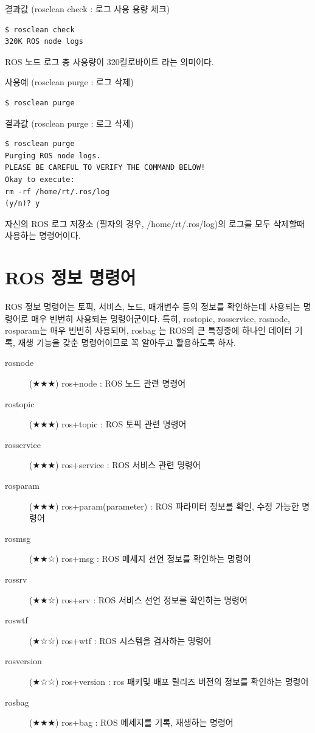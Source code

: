 \noindent
{}\circled{\thenum} 결과값 (rosclean check : 로그 사용 용량 체크)
\begin{lstlisting}[language=ROS]
$ rosclean check
320K ROS node logs
\end{lstlisting}

\noindent
ROS 노드 로그 총 사용량이 320킬로바이트 라는 의미이다.

\vspace{\baselineskip}
\noindent
{}\circled{\thenum} 사용예 (rosclean purge : 로그 삭제)
\begin{lstlisting}[language=ROS]
$ rosclean purge
\end{lstlisting}

\noindent
{}\circled{\thenum} 결과값 (rosclean purge : 로그 삭제)
\begin{lstlisting}[language=ROS]
$ rosclean purge 
Purging ROS node logs.
PLEASE BE CAREFUL TO VERIFY THE COMMAND BELOW!
Okay to execute:
rm -rf /home/rt/.ros/log
(y/n)? y
\end{lstlisting}

\noindent
자신의 ROS 로그 저장소 (필자의 경우, /home/rt/.ros/log)의 로그를 모두 삭제할때 사용하는 명령어이다.

\newpage
\section{ROS 정보 명령어}

ROS 정보 명령어는 토픽, 서비스, 노드, 매개변수 등의 정보를 확인하는데 사용되는 명령어로 매우 빈번히 사용되는 명령어군이다. 특히, rostopic, rosservice, rosnode, rosparam는 매우 빈번히 사용되며, rosbag 는 ROS의 큰 특징중에 하나인 데이터 기록, 재생 기능을 갖춘 명령어이므로 꼭 알아두고 활용하도록 하자.

\vspace{\baselineskip}
\noindent
\begin{description}
\item[rosnode] (★★★) ros+node : ROS 노드 관련 명령어
\item[rostopic] (★★★) ros+topic : ROS 토픽 관련 명령어
\item[rosservice] (★★★) ros+service : ROS 서비스 관련 명령어
\item[rosparam] (★★★) ros+param(parameter) : ROS 파라미터 정보를 확인, 수정 가능한 명령어
\item[rosmsg] (★★☆) ros+msg : ROS 메세지 선언 정보를 확인하는 명령어
\item[rossrv] (★★☆) ros+srv : ROS 서비스 선언 정보를 확인하는 명령어
\item[roswtf] (★☆☆) ros+wtf : ROS 시스템을 검사하는 명령어
\item[rosversion] (★☆☆) ros+version : ros 패키및 배포 릴리즈 버전의 정보를 확인하는 명령어
\item[rosbag] (★★★) ros+bag : ROS 메세지를 기록, 재생하는 명령어
\end{description}

